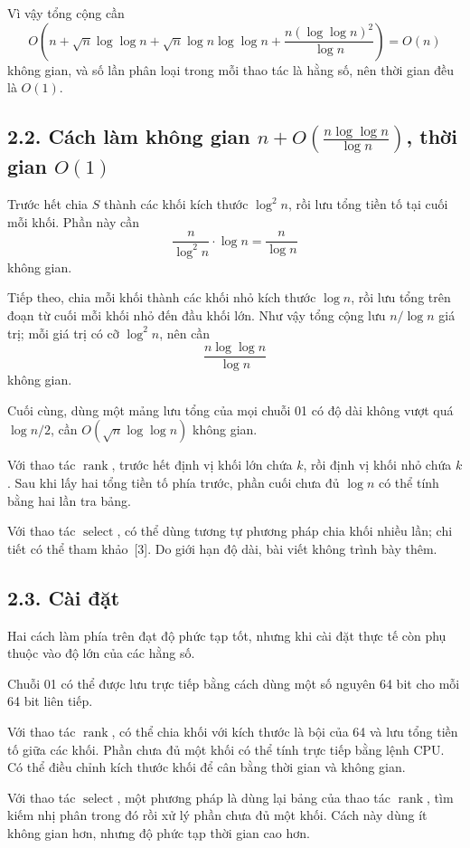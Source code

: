 \documentclass[11pt]{article}
\DeclareMathOperator{\rank}{rank}
\begin{document}
Vì vậy tổng cộng cần
\[
  O\left(n+\sqrt n\log\log n+\sqrt n\log n\log\log n+
  \frac{n(\log\log n)^2}{\log n}\right)=O(n)
\]
không gian, và số lần phân loại trong mỗi thao tác là hằng số, nên thời gian
đều là \(O(1)\).

\subsection*{2.2. Cách làm không gian \texorpdfstring{\(n+O\left(\frac{n\log\log n}{\log n}\right)\)}{n+O(n log log n/log n)}, thời gian \texorpdfstring{\(O(1)\)}{O(1)}}

Trước hết chia \(S\) thành các khối kích thước \(\log^2 n\), rồi lưu tổng
tiền tố tại cuối mỗi khối. Phần này cần
\[
  \frac{n}{\log^2 n}\cdot\log n=\frac{n}{\log n}
\]
không gian.

Tiếp theo, chia mỗi khối thành các khối nhỏ kích thước \(\log n\), rồi lưu
tổng trên đoạn từ cuối mỗi khối nhỏ đến đầu khối lớn. Như vậy tổng cộng lưu
\(n/\log n\) giá trị; mỗi giá trị có cỡ \(\log^2 n\), nên cần
\[
  \frac{n\log\log n}{\log n}
\]
không gian.

Cuối cùng, dùng một mảng lưu tổng của mọi chuỗi 01 có độ dài không vượt quá
\(\log n/2\), cần \(O(\sqrt n\log\log n)\) không gian.

Với thao tác \(\rank\), trước hết định vị khối lớn chứa \(k\), rồi định vị
khối nhỏ chứa \(k\). Sau khi lấy hai tổng tiền tố phía trước, phần cuối chưa
đủ \(\log n\) có thể tính bằng hai lần tra bảng.

Với thao tác \(\operatorname{select}\), có thể dùng tương tự phương pháp chia
khối nhiều lần; chi tiết có thể tham khảo~[3]. Do giới hạn độ dài, bài viết
không trình bày thêm.

\subsection*{2.3. Cài đặt}

Hai cách làm phía trên đạt độ phức tạp tốt, nhưng khi cài đặt thực tế còn phụ
thuộc vào độ lớn của các hằng số.

Chuỗi 01 có thể được lưu trực tiếp bằng cách dùng một số nguyên 64 bit cho mỗi
64 bit liên tiếp.

Với thao tác \(\rank\), có thể chia khối với kích thước là bội của 64 và lưu
tổng tiền tố giữa các khối. Phần chưa đủ một khối có thể tính trực tiếp bằng
lệnh CPU. Có thể điều chỉnh kích thước khối để cân bằng thời gian và không
gian.

Với thao tác \(\operatorname{select}\), một phương pháp là dùng lại bảng của
thao tác \(\rank\), tìm kiếm nhị phân trong đó rồi xử lý phần chưa đủ một
khối. Cách này dùng ít không gian hơn, nhưng độ phức tạp thời gian cao hơn.
\end{document}
